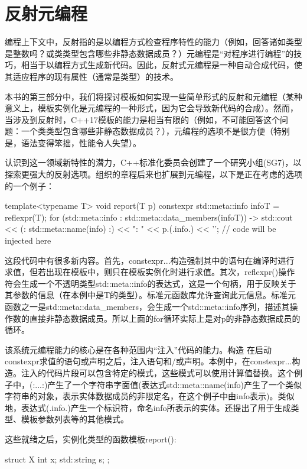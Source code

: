 \section{反射元编程}
编程上下文中，反射指的是以编程方式检查程序特性的能力（例如，回答诸如类型是整数吗？或类类型包含哪些非静态数据成员？）元编程是“对程序进行编程”的技巧，相当于以编程方式生成新代码。因此，反射式元编程是一种自动合成代码，使其适应程序的现有属性（通常是类型）的技术。

本书的第三部分中，我们将探讨模板如何实现一些简单形式的反射和元编程（某种意义上，模板实例化是元编程的一种形式，因为它会导致新代码的合成）。然而，当涉及到反射时，C++17模板的能力是相当有限的（例如，不可能回答这个问题：一个类类型包含哪些非静态数据成员？），元编程的选项不是很方便（特别是，语法变得笨拙，性能令人失望）。

认识到这一领域新特性的潜力，C++标准化委员会创建了一个研究小组(SG7)，以探索更强大的反射选项。组织的章程后来也扩展到元编程，以下是正在考虑的选项的一个例子：

\begin{cpp}
template<typename T> void report(T p) {
	constexpr {
		std::meta::info infoT = reflexpr(T);
		for (std::meta::info : std::meta::data_members(infoT)) {
			-> {
				std::cout << (: std::meta::name(info) :)
				<< ": " << p.(.info.) << '\n';
			}
		}
	}
	// code will be injected here
}
\end{cpp}

这段代码中有很多新内容。首先，constexpr{...}构造强制其中的语句在编译时进行求值，但若出现在模板中，则只在模板实例化时进行求值。其次，reflexpr()操作符会生成一个不透明类型std::meta::info的表达式，这是一个句柄，用于反映关于其参数的信息（在本例中是T的类型）。标准元函数库允许查询此元信息。标准元函数之一是std::meta::data\_members，会生成一个std::meta::info序列，描述其操作数的直接非静态数据成员。所以上面的for循环实际上是对p的非静态数据成员的循环。

该系统元编程能力的核心是在各种范围内“注入”代码的能力。构造  在启动constexpr求值的语句或声明之后，注入语句和/或声明。本例中，在constexpr{...}构造。注入的代码片段可以包含特定的模式，这些模式可以使用计算值替换。这个例子中，(:...:)产生了一个字符串字面值(表达式std::meta::name(info)产生了一个类似字符串的对象，表示实体数据成员的非限定名，在这个例子中由info表示)。类似地，表达式(.info.)产生一个标识符，命名info所表示的实体。还提出了用于生成类型、模板参数列表等的其他模式。

这些就绪之后，实例化类型的函数模板report():

\begin{cpp}
struct X {
	int x;
	std::string s;
};
\end{cpp}

